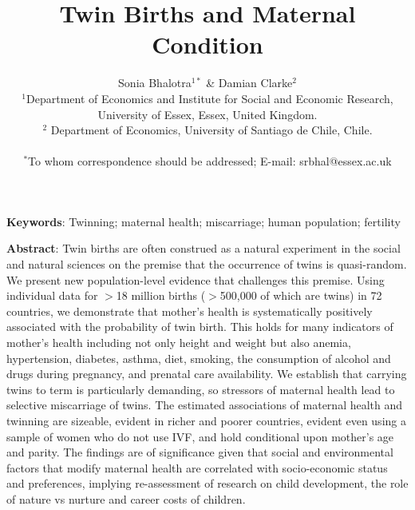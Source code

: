 \documentclass[11pt]{article}
\title{Twin Births and Maternal Condition}
\author{Sonia Bhalotra$^{1\ast}$ \& Damian Clarke$^2$      \\
  \normalsize{$^{1}$Department of Economics and Institute for Social and Economic Research,} \\
  \normalsize{University of Essex, Essex, United Kingdom.}\\
      \normalsize{$^{2}$ Department of Economics, University of Santiago de Chile, Chile.}\\
      \\
      \normalsize{$^\ast$To whom correspondence should be addressed; E-mail:  srbhal@essex.ac.uk}
}
\date{}
\begin{document}
\baselineskip24pt

\maketitle

\noindent\textbf{Keywords}: Twinning; maternal health; miscarriage; human population; fertility
\vspace{4mm}

\linenumbers
\noindent\textbf{Abstract}:
Twin births are often construed as a natural experiment in the social and natural sciences on the premise that the occurrence of twins is quasi-random. We present new population-level evidence that challenges this premise. Using individual data for $>$18 million births ($>$500,000 of which are twins) in 72 countries, we demonstrate that mother's health is systematically positively associated with the probability of twin birth. This holds for many indicators of mother's health including not only height and weight but also anemia, hypertension, diabetes, asthma, diet, smoking, the consumption of alcohol and drugs during pregnancy, and prenatal care availability. We establish that carrying twins to term is particularly demanding, so stressors of maternal health lead to selective miscarriage of twins.  The estimated associations of maternal health and twinning are sizeable, evident in richer and poorer countries, evident even using a sample of women who do not use IVF, and hold conditional upon mother's age and parity. The findings are of significance given that social and environmental factors that modify maternal health are correlated with socio-economic status and preferences, implying re-assessment of research on child development, the role of nature vs nurture and career costs of children.
\vspace{4mm}

\newpage
\end{document}
